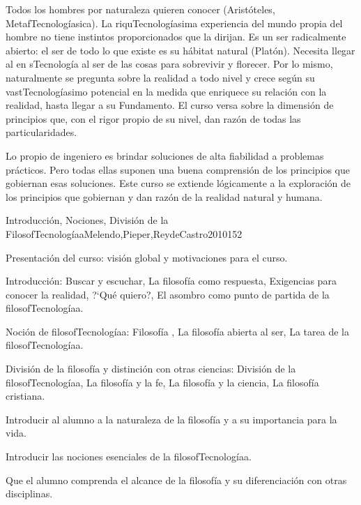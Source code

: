 \begin{syllabus}


\begin{justification}
Todos los hombres por naturaleza quieren conocer  (Aristóteles, MetafTecnologíasica). La riquTecnologíasima experiencia del mundo propia del hombre no tiene instintos proporcionados que la dirijan. Es un ser radicalmente abierto: el ser de todo lo que existe es su  hábitat  natural (Platón). Necesita llegar al  en sTecnología al ser de las cosas para sobrevivir y florecer. Por lo mismo, naturalmente se pregunta sobre la realidad a todo nivel y crece según su vastTecnologíasimo potencial en la medida que enriquece su relación con la realidad, hasta llegar a su Fundamento. El curso versa sobre la dimensión de principios que, con el rigor propio de su nivel, dan razón de todas las particularidades.
\end{justification}

\begin{goals}
\item Lo propio de ingeniero es brindar soluciones de alta fiabilidad a problemas prácticos. Pero todas ellas suponen una buena comprensión de los principios que gobiernan esas soluciones. Este curso se extiende lógicamente a la exploración de los principios que gobiernan y dan razón de la realidad natural y humana.
\end{goals}

\begin{outcomes}
\end{outcomes}

\begin{unit}{Introducción, Nociones, División de la FilosofTecnologíaa}{Melendo,Pieper,ReydeCastro2010}{15}{2}
\begin{topics}
	\item Presentación del curso: visión global y motivaciones para el curso.
	\item Introducción: Buscar y escuchar, La filosofía como respuesta, Exigencias para conocer la realidad, ?`Qué quiero?, El asombro como punto de partida de la filosofTecnologíaa.
	\item Noción de filosofTecnologíaa:  Filosofía , La filosofía abierta al ser, La tarea de la filosofTecnologíaa.
	\item División de la filosofía y distinción con otras ciencias: División de la filosofTecnologíaa, La filosofía y la fe, La filosofía y la ciencia,  La filosofía cristiana.
\end{topics}
\begin{unitgoals}
	\item Introducir al alumno a la naturaleza de la filosofía y a su importancia para la vida.
	\item Introducir las nociones esenciales de la filosofTecnologíaa.
	\item Que el alumno comprenda el alcance de la filosofía y su diferenciación con otras disciplinas.
\end{unitgoals}
\end{unit}


\end{syllabus}
